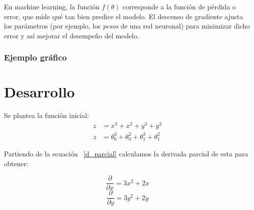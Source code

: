 \documentclass{iopjournal}
\begin{document}
En machine learning, la función $f(\theta)$ corresponde a la función de pérdida o error, que mide qué tan bien predice el modelo.  
El descenso de gradiente ajusta los parámetros (por ejemplo, los \emph{pesos} de una red neuronal) para minimizar dicho error y así mejorar el desempeño del modelo.

\subsubsection*{Ejemplo gráfico}

\begin{center}
\end{center}

\section{Desarrollo}
Se plantea la función inicial:
\begin{equation} \label{ec_init}
\begin{aligned}
   z &= x^3 + x^2 + y^3 + y^2 \\
   z &= \theta_0^3 + \theta_0^2 + \theta_1^3 + \theta_1^2
\end{aligned}
\end{equation}

Partiendo de la ecuación ~\ref{d_parcial} calculamos la derivada parcial de esta para obtener:

\begin{equation}
    \frac{\partial}{\partial x} = 3x^2 + 2x
\end{equation}
\begin{equation}
    \frac{\partial}{\partial y} = 3y^2 + 2y
\end{equation}
\end{document}
